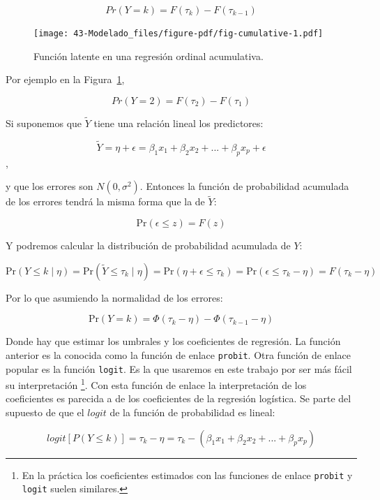 \documentclass[
  12pt,
  a4paper,
  extrafontsizes,
  onecolumn,
  openright]{memoir}
\begin{document}
\[Pr(Y = k) = F(\tau_k) - F(\tau_{k-1})\]

\begin{figure}[h]

{\centering \texttt{[image: 43-Modelado\_files/figure-pdf/fig-cumulative-1.pdf]}

}

\caption{\label{fig-cumulative}Función latente en una regresión ordinal
acumulativa.}

\end{figure}

Por ejemplo en la Figura~\ref{fig-cumulative},

\[Pr(Y = 2) = F(\tau_2) - F(\tau_{1})\]

Si suponemos que \(\tilde{Y}\) tiene una relación lineal los
predictores:

\[\tilde{Y} = \eta + \epsilon = \beta_1 x_1 + \beta_2 x_2 + ... + \beta_p x_p + \epsilon\],

y que los errores son \(N(0,\sigma^2)\). Entonces la función de
probabilidad acumulada de los errores tendrá la misma forma que la de
\(\tilde{Y}\):

\[\mathrm{Pr}(\epsilon \leq z) = F(z)\]

Y podremos calcular la distribución de probabilidad acumulada de \(Y\):

\[\mathrm{Pr}(Y \leq k \mid \eta) = \mathrm{Pr}(\tilde{Y} \leq \tau_k \mid \eta) = \mathrm{Pr}(\eta + \epsilon \leq \tau_k) = \mathrm{Pr}(\epsilon \leq \tau_k - \eta) = F(\tau_k - \eta)\]

Por lo que asumiendo la normalidad de los errores:

\[\mathrm{Pr}(Y = k) = \Phi(\tau_k - \eta) - \Phi(\tau_{k - 1} - \eta)\]

Donde hay que estimar los umbrales y los coeficientes de regresión. La
función anterior es la conocida como la función de enlace
\texttt{probit}. Otra función de enlace popular es la función
\texttt{logit}. Es la que usaremos en este trabajo por ser más fácil su
interpretación \footnote{En la práctica los coeficientes estimados con
  las funciones de enlace \texttt{probit} y \texttt{logit} suelen
  similares.}. Con esta función de enlace la interpretación de los
coeficientes es parecida a de los coeficientes de la regresión
logística. Se parte del supuesto de que el \(logit\) de la función de
probabilidad es lineal:

\[logit [P(Y \le k)] = \tau_{k} - \eta = \tau_{k} - (\beta_1 x_1 + \beta_2 x_2 + ... + \beta_p x_p)\]
\end{document}
